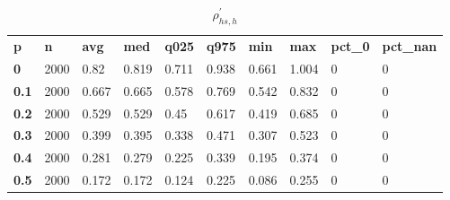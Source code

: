 \begin{table}[h]
 \centering 
\footnotesize
\caption{$\rho_{hs,h}^\prime $}
\label{tab:alphahsh}
\begin{tabular}[h]{| l l l l l l l l l l|
    } \hline
\textbf{ p} & \textbf{ n} & \textbf{ avg} & \textbf{ med} & \textbf{ q025} & \textbf{ q975} & \textbf{ min} & \textbf{ max} & \textbf{ pct\_0} & \textbf{ pct\_nan}
           \\
  \textbf{  0} & 2000 &  0.82 & 0.819 & 0.711 & 0.938 & 0.661 & 1.004 & 0 & 0
           \\
  \textbf{0.1} & 2000 & 0.667 & 0.665 & 0.578 & 0.769 & 0.542 & 0.832 & 0 & 0
           \\
  \textbf{0.2} & 2000 & 0.529 & 0.529 &  0.45 & 0.617 & 0.419 & 0.685 & 0 & 0
           \\
  \textbf{0.3} & 2000 & 0.399 & 0.395 & 0.338 & 0.471 & 0.307 & 0.523 & 0 & 0
           \\
  \textbf{0.4} & 2000 & 0.281 & 0.279 & 0.225 & 0.339 & 0.195 & 0.374 & 0 & 0
           \\
  \textbf{0.5} & 2000 & 0.172 & 0.172 & 0.124 & 0.225 & 0.086 & 0.255 & 0 & 0
           \\
 \hline \end{tabular}
 \end{table}
